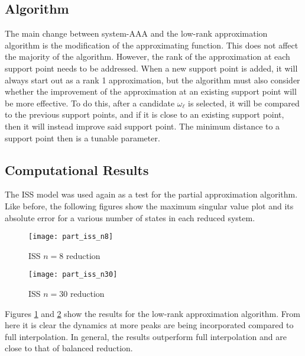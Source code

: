 \documentclass[letterpaper, 10 pt, conference]{ieeeconf}  %
\begin{document}
\subsection{Algorithm}
The main change between system-AAA and the low-rank approximation algorithm is the modification of the approximating function.  This does not affect the majority of the algorithm.  However, the rank of the approximation at each support point needs to be addressed.  When a new support point is added, it will always start out as a rank 1 approximation, but the algorithm must also consider whether the improvement of the approximation at an existing support point will be more effective.  To do this, after a candidate \(\omega_\ell\) is selected, it will be compared to the previous support points, and if it is close to an existing support point, then it will instead improve said support point.  The minimum distance to a support point then is a tunable parameter.  

\subsection{Computational Results}
The ISS model was used again as a test for the partial approximation algorithm.  Like before, the following figures show the maximum singular value plot and its absolute error for a various number of states in each reduced system.  

\begin{figure}[!ht]
        \texttt{[image: part\_iss\_n8]}
        \caption{ISS \(n=8\) reduction}
        \label{part_iss_n8}
\end{figure}

\begin{figure}[!ht]
        \texttt{[image: part\_iss\_n30]}
        \caption{ISS \(n=30\) reduction}
        \label{part_iss_n30}
\end{figure}

Figures \ref{part_iss_n8} and \ref{part_iss_n30} show the results for the low-rank approximation algorithm.  From here it is clear the dynamics at more peaks are being incorporated compared to full interpolation.  In general, the results outperform full interpolation and are close to that of balanced reduction.  

\begin{comment}
        \begin{figure}[!ht]
                \texttt{[image: part\_iss\_n26]}
                \caption{ISS \(n=26\) reduction}
                \label{part_iss_n26}
        \end{figure}
\end{comment}
\end{document}
